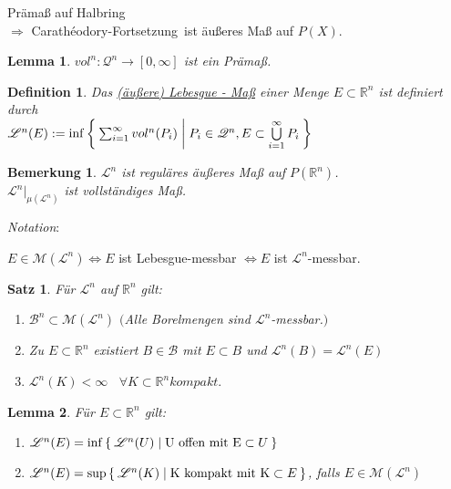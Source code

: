 \documentclass[11pt]{memoir}
\theoremstyle{changebreak}
\newtheorem{Definition}{Definition}[chapter]
\newtheorem{Bemerkung}{Bemerkung}[chapter]
\newtheorem{Lemma}{Lemma}[chapter]
\newtheorem{Satz}{Satz}[chapter]
\newcommand{\cara}{Carathéodory-Fortsetzung}
\begin{document}
	Prämaß auf Halbring\\
	$\Rightarrow$ \cara\, ist äußeres Maß auf $P(X)$.

\begin{Lemma}
	$vol^n : \mathscr{Q}^n \rightarrow [0, \infty]$ ist ein Prämaß.
\end{Lemma}

\begin{Definition}
	Das \underline{(äußere) Lebesgue - Maß} einer Menge $E \subset \mathbb{R}^n$ ist definiert durch\\
	$ \mathscr{L}^n(E) := \inf \Set{ \sum_{i = 1}^{\infty} vol^n(P_i) | P_i \in \mathscr{Q}^n, E \subset \bigcup\limits_{i = 1}^\infty P_i }$
\end{Definition}

\begin{Bemerkung}
$\mathscr L^n$ ist reguläres äußeres Maß auf $P(\mathbb R^n)$. \\
$\mathscr L^n \vert_{\mu(\mathscr L^n)}$ ist vollständiges Maß.
\end{Bemerkung}

\par
\emph{Notation}: 
\begin{center}
	$E \in \mathscr M(\mathscr L^n) \Leftrightarrow E$ ist Lebesgue-messbar $\Leftrightarrow E$ ist $\mathscr L^n$-messbar.
\end{center}
\par

\begin{Satz}
	Für $\mathscr{L}^n$ auf $\mathbb{R}^n$ gilt:
	\begin{enumerate}
		\item $\mathscr{B}^n \subset \mathscr{M}(\mathscr{L}^n)$ \quad $($Alle Borelmengen sind $\mathscr{L}^n$-messbar.$)$
		\item Zu $E \subset \mathbb{R}^n$ existiert $B \in \mathscr{B}$ mit $E \subset B$
			und $\mathscr{L}^n(B) = \mathscr{L}^n(E)$
		\item $\mathscr{L}^n(K) < \infty$ \, $\forall K \subset \mathbb{R}^n kompakt.$
	\end{enumerate}
\end{Satz}

\begin{Lemma}
	Für $E \subset \mathbb{R}^n$ gilt:
	\begin{enumerate}
		\item $\mathscr{L}^n(E) = \inf\Set{\mathscr{L}^n(U) | \text{U offen mit E} \subset{U}}$
		\item $\mathscr{L}^n(E) = \sup\Set{\mathscr{L}^n(K) | \text{K kompakt mit K} \subset{E}}$,
			falls $E \in \mathscr{M}(\mathscr{L}^n)$
	\end{enumerate}
\end{Lemma}
\end{document}

